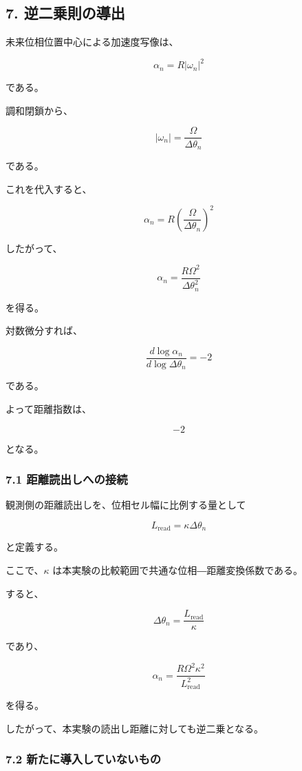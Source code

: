 \documentclass[
  10pt,
  a4paper,
]{ltjsarticle}
\begin{document}
\subsection{7.
逆二乗則の導出}\label{ux9006ux4e8cux4e57ux5247ux306eux5c0eux51fa}

未来位相位置中心による加速度写像は、

\[
\alpha_n=R|\omega_n|^2
\]

である。

調和閉鎖から、

\[
|\omega_n|
=\frac{\Omega}{\Delta\theta_n}
\]

である。

これを代入すると、

\[
\alpha_n
=R\left(\frac{\Omega}{\Delta\theta_n}\right)^2
\]

したがって、

\[
\boxed{
\alpha_n
=\frac{R\Omega^2}{\Delta\theta_n^2}
}
\]

を得る。

対数微分すれば、

\[
\frac{d\log\alpha_n}
{d\log\Delta\theta_n}
=-2
\]

である。

よって距離指数は、

\[
\boxed{-2}
\]

となる。

\subsubsection{7.1
距離読出しへの接続}\label{ux8dddux96e2ux8aadux51faux3057ux3078ux306eux63a5ux7d9a}

観測側の距離読出しを、位相セル幅に比例する量として

\[
L_{\mathrm{read}}
=\kappa\Delta\theta_n
\]

と定義する。

ここで、\(\kappa\) は本実験の比較範囲で共通な位相―距離変換係数である。

すると、

\[
\Delta\theta_n
=\frac{L_{\mathrm{read}}}{\kappa}
\]

であり、

\[
\boxed{
\alpha_n
=\frac{R\Omega^2\kappa^2}
{L_{\mathrm{read}}^2}
}
\]

を得る。

したがって、本実験の読出し距離に対しても逆二乗となる。

\subsubsection{7.2
新たに導入していないもの}\label{ux65b0ux305fux306bux5c0eux5165ux3057ux3066ux3044ux306aux3044ux3082ux306e}
\end{document}
